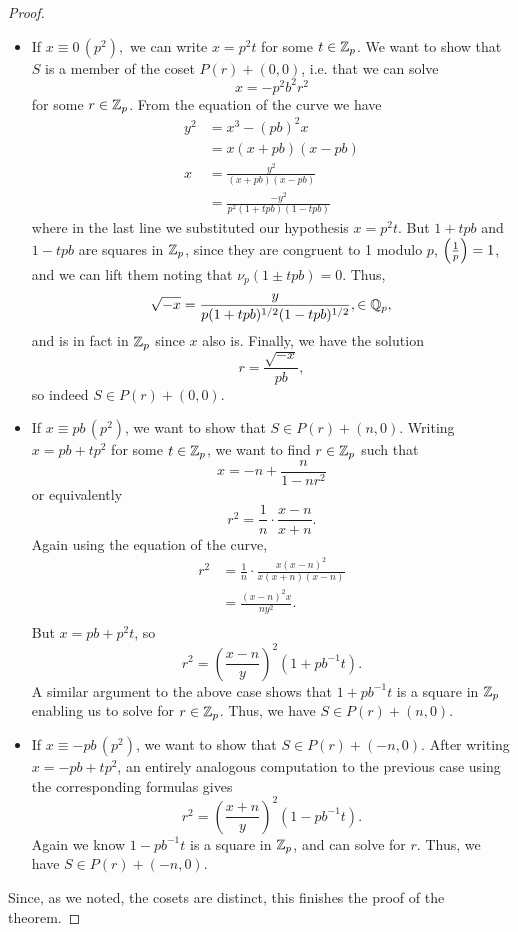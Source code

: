 \documentclass[12pt, a4paper]{report}
\begin{document}
\begin{proof}
  \begin{itemize}
    \item If $x \equiv 0 \, (p^2),$ we can write $x = p^2t$ for some $t \in
      {\mathbb Z}_p$. We want to show that $S$ is a member of the coset $P(r) + (0,0)$,
      i.e. that we can solve
      \[x = -p^2b^2r^2\]
      for some $r \in {\mathbb Z}_p$.
      From the equation of the curve we have
      \begin{equation*}
        \begin{split}
          y^2 &= x^3 - (pb)^2x \\
          &= x(x+pb)(x-pb) \\
          x &= \frac{y^2}{(x+pb)(x-pb)} \\
          &= \frac{-y^2}{p^2(1+tpb)(1-tpb)}
        \end{split}
      \end{equation*}
      where in the last line we substituted our hypothesis $x = p^2t.$ But
      $1 + tpb$ and $1-tpb$ are squares in ${\mathbb Z}_p$, since they are congruent to
      1 modulo $p$, $\left(\frac{1}{p}\right) = 1$, and we can lift them noting that
      $\nu_p(1 \pm tpb) = 0$. Thus, 
      \[\sqrt{-x} = \frac{y}{p (1+tpb)^{1/2} (1-tpb)^{1/2}}, \in {\mathbb Q}_p,\]
      and is in fact in ${\mathbb Z}_p$ since $x$ also is. Finally, we have the solution
      \[r = \frac{\sqrt{-x}}{pb},\]
      so indeed $S \in P(r) + (0,0).$


    \item If $x \equiv pb \, (p^2)$, we want to show that $S \in P(r) + (n,0)$.
      Writing $x = pb + tp^2$ for some $t \in {\mathbb Z}_p$, we want to find $r \in
      {\mathbb Z}_p$ such that
      \[x = -n + \frac{n}{1-nr^2} \]
      or equivalently
      \[r^2 = \frac{1}{n} \cdot \frac{x-n}{x+n}. \]
      Again using the equation of the curve,
      \[ \begin{split} r^2 &= \frac{1}{n} \cdot \frac{x (x-n)^2}{x
            (x+n)(x-n)} \\
          &= \frac{(x-n)^2x}{n y^2}. \\
        \end{split}\]
      But $x = pb + p^2t$, so
      \[ r^2 = \left(\frac{x-n}{y}\right)^2 (1+pb^{-1}t).\]
      A similar argument to the above case shows that $1+pb^{-1}t$ is
      a square in ${\mathbb Z}_p$ enabling us to solve for $r \in {\mathbb Z}_p$.
      Thus, we have $S \in P(r) + (n,0)$.

    \item If $x \equiv -pb \, (p^2)$, we want to show that $S \in P(r) +
      (-n,0)$. After writing $x = -pb + tp^2$, an entirely analogous computation
      to the previous case using the corresponding formulas gives
      \[r^2 = \left( \frac{x+n}{y} \right)^2 (1 - pb^{-1}t).\]
      Again we know $1-pb^{-1}t$ is a square in ${\mathbb Z}_p$, and can solve for
      $r$. Thus, we have $S \in P(r) + (-n,0)$.
  \end{itemize}

  Since, as we noted, the cosets are distinct, this finishes the proof of the theorem.
\end{proof}
\end{document}
